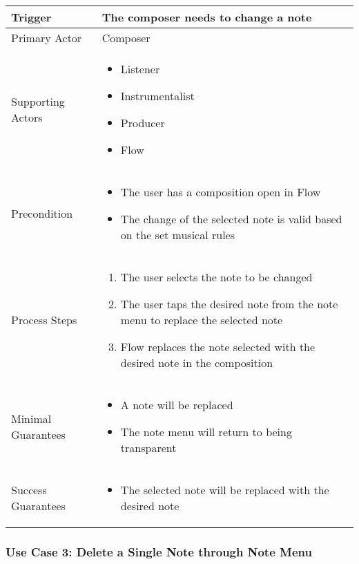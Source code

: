 \begin{tabularx}{\textwidth}{|X|X|}
\hline
Trigger & 
The composer needs to change a note \\
\hline
Primary Actor & 
Composer\\
\hline
Supporting Actors & 
\begin{itemize}
\item Listener
\item Instrumentalist
\item Producer
\item Flow
\end{itemize} \\
\hline
Precondition & 
\begin{itemize}
\item The user has a composition open in Flow  
\item The change of the selected note is valid based on the set musical rules
\end{itemize} \\
\hline
Process Steps & 
\begin{enumerate}
\item The user selects the note to be changed 
\item The user taps the desired note from the note menu to replace the selected note
\item Flow replaces the note selected with the desired note in the composition
\end{enumerate} \\
\hline
Minimal Guarantees & 
\begin{itemize}
  \item A note will be replaced
  \item The note menu will return to being transparent
\end{itemize} \\
\hline
Success Guarantees & 
\begin{itemize}
  \item The selected note will be replaced with the desired note
\end{itemize} \\
\hline
\end{tabularx}


\subsubsection{Use Case 3: Delete a Single Note through Note Menu}


